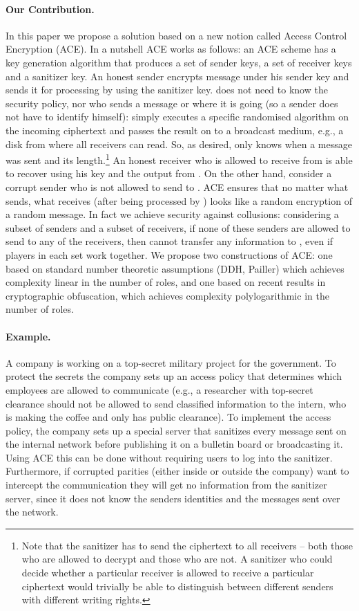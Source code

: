 \documentclass{llncs}
\begin{document}
\paragraph{Our Contribution.} In this paper we propose a solution based on
a new notion called Access Control Encryption (ACE).
In a nutshell ACE works as follows:  an ACE scheme has a key generation algorithm that produces a set of sender keys, a set of receiver keys and a sanitizer key. 
An honest  sender   encrypts  message  under his sender key and sends it for processing by  using the sanitizer key.  does not need to know the security policy, nor who sends a message or where it is going (so a sender does not have to identify himself):  simply executes a specific randomised algorithm on the incoming ciphertext and passes the result on to a broadcast medium, e.g., a disk from where all receivers can read. So, as desired, 
 only knows when a message was sent and its length.\footnote{Note that the sanitizer has to send the ciphertext to all receivers -- both those who are allowed to decrypt and those who are not. A sanitizer who could decide whether a particular receiver is allowed to receive a particular ciphertext would trivially be able to distinguish between different senders with different writing rights.} An honest receiver  who is allowed to receive from  is able to recover  
using his key and the output from . On the other hand, consider a corrupt sender  who is not allowed to send to . ACE ensures that no matter what  sends, what  receives (after being processed by ) looks like a random encryption of a random message.
 In fact we achieve security against collusions: considering a subset  of senders and a subset  of receivers, if none of these senders are allowed to send to any of the receivers, then  cannot transfer any information to 
, even if players in each set work together. We propose two constructions of ACE: one based on standard number theoretic assumptions (DDH, Pailler) which achieves complexity linear in the number of roles,  and one based on recent results in cryptographic obfuscation, which achieves complexity polylogarithmic in the number of roles.


\paragraph{Example.} A company is working on a top-secret military project for the government. To protect the secrets the company sets up an access policy that determines which employees are allowed to communicate (e.g., a researcher with top-secret clearance should not be allowed to send classified information to the intern, who is making the coffee and only has public clearance). 
To implement the access policy, the company sets up a special server that sanitizes every message sent on the internal network before publishing it on a bulletin board or broadcasting it. Using ACE this can be done without requiring users to log into the sanitizer. Furthermore,  if corrupted parities (either inside or outside the company) want to intercept the communication they will get no information from the sanitizer server, since it does not know the senders identities and the messages sent over the network.
\end{document}
